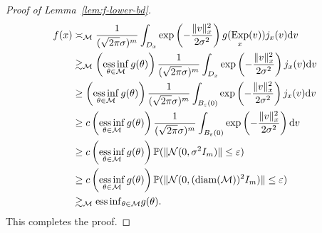 \documentclass[preprint]{imsart}
\theoremstyle{plain}
\theoremstyle{definition}
\newcommand{\Pbb}{\mathbb{P}}
\newcommand{\Ncal}{\mathcal{N}}
\newcommand{\Mcal}{\mathcal{M}}
\newcommand{\diff}{\textnormal{d}}
\DeclareMathOperator{\Exp}{Exp}
\DeclareMathOperator{\diam}{diam}
\begin{document}
\begin{appendix}
\begin{proof}[Proof of Lemma~\ref{lem:f-lower-bd}]
    \begin{align*}
        f(x) &\asymp_{\Mcal} \frac{1}{(\sqrt{2\pi}\sigma)^m}\int_{D_x}\exp\left(-\frac{\|v\|_x^2}{2\sigma^2}\right)g(\Exp_x(v))j_x(v)\diff v \\
        &\gtrsim_{\Mcal} \left(\underset{\theta\in\Mcal}{\textnormal{ess}\inf}\,g(\theta)\right)\frac{1}{(\sqrt{2\pi}\sigma)^m}\int_{D_x}\exp\left(-\frac{\|v\|_x^2}{2\sigma^2}\right)j_x(v)\diff v \\
        &\ge \left(\underset{\theta\in\Mcal}{\textnormal{ess}\inf}\,g(\theta)\right)\frac{1}{(\sqrt{2\pi}\sigma)^m}\int_{B_{\varepsilon}(0)}\exp\left(-\frac{\|v\|_x^2}{2\sigma^2}\right)j_x(v)\diff v \\
        &\ge c\left(\underset{\theta\in\Mcal}{\textnormal{ess}\inf}\,g(\theta)\right)\frac{1}{(\sqrt{2\pi}\sigma)^m}\int_{B_{\varepsilon}(0)}\exp\left(-\frac{\|v\|_x^2}{2\sigma^2}\right)\diff v \\
        &\ge c\left(\underset{\theta\in\Mcal}{\textnormal{ess}\inf}\,g(\theta)\right)\Pbb(\|\Ncal(0,\sigma^2I_m)\|\le \varepsilon) \\
        &\ge c\left(\underset{\theta\in\Mcal}{\textnormal{ess}\inf}\,g(\theta)\right)\Pbb(\|\Ncal(0,(\diam(\Mcal))^2I_m)\|\le \varepsilon) \\
        &\gtrsim_{\Mcal} {\textnormal{ess}\inf}_{\theta\in\Mcal}g(\theta).
    \end{align*}
    This completes the proof.
\end{proof}


\end{appendix}
\end{document}
